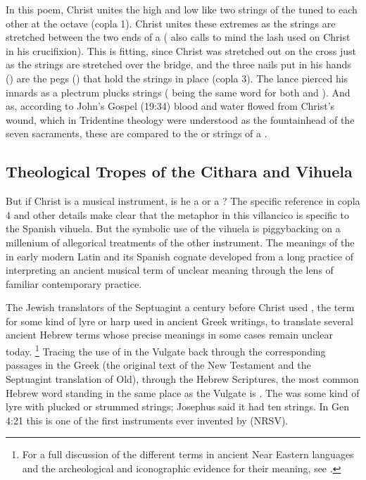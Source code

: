 In this poem, Christ unites the high and low like two strings of the  tuned to each other at the octave (copla 1). 
Christ unites these extremes as the strings are stretched between the two ends of a  ( also calls to mind the lash used on Christ in his crucifixion).
This is fitting, since Christ was stretched out on the cross just as the strings are stretched over the bridge, and the three nails put in his hands () are the pegs () that hold the strings in place (copla 3).
The lance pierced his innards as a plectrum plucks strings ( being the same word for both  and ).
And as, according to John's Gospel (19:34) blood and water flowed from Christ's wound, which in Tridentine theology were understood as the fountainhead of the seven sacraments, these are compared to the  or strings of a .

\subsection{Theological Tropes of the Cithara and Vihuela}

But if Christ is a musical instrument, is he a  or a ?
The specific reference in copla 4 and other details make clear that the metaphor in this villancico is specific to the Spanish  vihuela.
But the symbolic use of the vihuela is piggybacking on a millenium of allegorical treatments of the other instrument.
The meanings of the  in early modern Latin and its Spanish cognate  developed from a long practice of interpreting an ancient musical term of unclear meaning through the lens of familiar contemporary practice.

The Jewish translators of the Septuagint a century before Christ used
, the term for some kind of lyre or harp used in ancient Greek writings, to translate several ancient Hebrew terms whose precise meanings in some cases remain unclear today.%
	\footnote{%
	For a full discussion of the different terms in ancient Near Eastern languages and the archeological and iconographic evidence for their meaning, see \autocite{Lawergren:Lyres}.
	}
Tracing the use of  in the Vulgate back through the corresponding passages in the Greek (the original text of the New Testament and the Septuagint translation of Old), through the Hebrew Scriptures, the most common Hebrew word standing in the same place as the Vulgate  is .
The  was some kind of lyre with plucked or strummed strings; Josephus said it had ten strings.%
	\autocites[]{Bromily:BibleEncyclopedia}
In Gen 4:21 this is one of the first instruments ever invented by  (NRSV).

